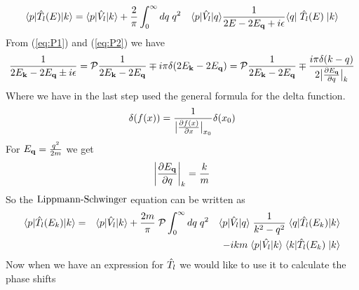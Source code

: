 %
\begin{equation}\label{eq:Tmy}
\braketm{{ p}} {\op{T}_l(E)}{{ k}} =\braketm{{ p}}{\op{V}_l}{{ k}}
+ \frac{2}{\pi}\int^{\infty}_{0}d { q}\; q^2 \quad\bra{{ p}}\op{V}_l\ket{{ q}}
\inv{2E-2E_{\bf q}+i\epsilon}  \bra{{ q}} \;\op{T}_l(E)\;\ket{{ k}}
\end{equation}
From (\ref{eq:P1}) and (\ref{eq:P2}) we have
\begin{equation}\label{eq:Tmyekstra}
\inv{2E_{\bf k}-2E_{\bf q}\pm i\epsilon}={\cal P}\inv{2E_{\bf k}-2E_{\bf q}}\mp 
i\pi\delta(2E_{\bf k}-2E_{\bf q})={\cal P}\inv{2E_{\bf k}-2E_{\bf q}}\mp 
\frac{i\pi\delta({ k}-{ q})}{2\big|\frac{\partial E_{\bf q}}{\partial { q}}\big|_{{ k}}}
\end{equation}
Where we have in the last step used the general formula for the delta function.
\begin{equation}\label{eq:deltaf} 
\delta (f(x))=\inv{\big|\frac{\partial f(x)}{\partial x}\big|_{x_0}}\delta (x_0)
\end{equation}
%
%
For $E_{\bf q}=\frac{{ q}^2}{2m}$ we get
%
\begin{equation}\label{eq:Tnrel}
\bigg|\frac{\partial E_{\bf q}}{\partial { q}}\bigg|_{{ k}}=\frac{{ k}}{m}
\end{equation}
%
So the $\text{Lippmann-Schwinger}$ equation can be written as
%
\begin{eqnarray}\label{eq:Tnrelllll} 
\braketm{{ p}} {\op{T}_l(E_{ k})}{{ k}}&=&\braketm{{ p}}{\op{V}_l}{{ k}}
+ \frac{2m}{\pi}\;{\cal P}\int^{\infty}_{0}d { q}\; q^2 \quad\bra{{ p}}\op{V}_l\ket{{ q}}
\;\inv{{ k^2}-{ q^2}}   \;\bra{{ q}}\op{T}_l(E_{ k})\ket{{ k}}\nonumber\\
&&
-i { k}m \;\bra{{ p}}\op{V_l}\ket{{ k}}
   \;\bra{{ k}}\op{T}_l(E_{ k})\;\ket{{ k}}
\end{eqnarray}
%
Now when we have an expression for $\hat{T}_l$ we would like to use it to calculate the phase shifts
